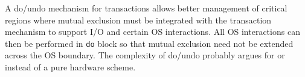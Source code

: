 A do/undo mechanism for transactions allows
better management of critical regions where mutual exclusion must be
integrated with the transaction mechanism to support I/O and certain
OS interactions.  All OS interactions can then be performed in
\texttt{do} block so that mutual exclusion need not be extended across
the OS boundary.  The complexity of do/undo probably argues for \apex
or \hyx instead of a pure hardware scheme.

